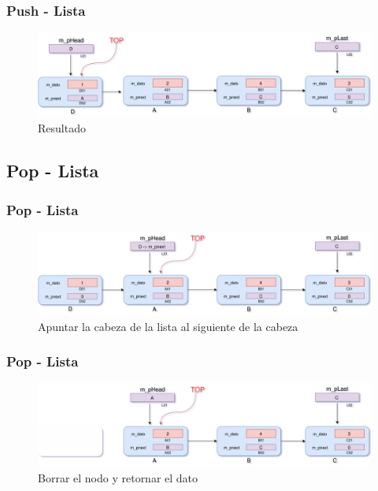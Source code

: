\documentclass{beamer}
\begin{document}
\begin{frame}
    \frametitle{Push - Lista}
    
    \begin{figure}
    \includegraphics[width =1 \textwidth]{images/push04}
    \caption{Resultado}
    \end{figure}
       
\end{frame}


\subsection{Pop - Lista}
\begin{frame}
    \frametitle{Pop - Lista}
    
    \begin{figure}
    \includegraphics[width =1 \textwidth]{images/pop02}
    \caption{Apuntar la cabeza de la lista al siguiente de la cabeza}
    \end{figure}
       
\end{frame}

\begin{frame}
    \frametitle{Pop - Lista}
    
    \begin{figure}
    \includegraphics[width =1 \textwidth]{images/pop03}
    \caption{Borrar el nodo y retornar el dato}
    \end{figure}
       
\end{frame}
\end{document}
